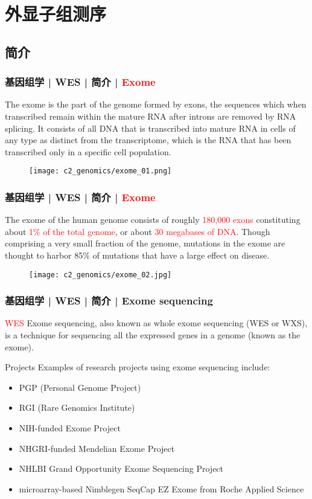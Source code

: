 \section{外显子组测序}
\subsection{简介}
\begin{frame}
  \frametitle{基因组学 | WES | 简介 | \textcolor{red}{Exome}}
  The exome is the part of the genome formed by exons, the sequences which when transcribed remain within the mature RNA after introns are removed by RNA splicing. It consists of all DNA that is transcribed into mature RNA in cells of any type as distinct from the transcriptome, which is the RNA that has been transcribed only in a specific cell population.
  \begin{figure}
    \centering
    \texttt{[image: c2\_genomics/exome\_01.png]}
  \end{figure}
\end{frame}

\begin{frame}
  \frametitle{基因组学 | WES | 简介 | \textcolor{red}{Exome}}
  The exome of the human genome consists of roughly \textcolor{red}{180,000 exons} constituting about \textcolor{red}{1\% of the total genome}, or about \textcolor{red}{30 megabases of DNA}. Though comprising a very small fraction of the genome, mutations in the exome are thought to harbor 85\% of mutations that have a large effect on disease.
  \begin{figure}
    \centering
    \texttt{[image: c2\_genomics/exome\_02.jpg]}
  \end{figure}
\end{frame}

\begin{frame}
  \frametitle{基因组学 | WES | 简介 | Exome sequencing}
  \begin{block}{\textcolor{red}{WES}}
  Exome sequencing, also known as whole exome sequencing (WES or WXS), is a technique for sequencing all the expressed genes in a genome (known as the exome).
  \end{block}
  \pause
  \begin{block}{Projects}
    Examples of research projects using exome sequencing include:
    \begin{itemize}
      \item PGP (Personal Genome Project)
      \item RGI (Rare Genomics Institute)
      \item NIH-funded Exome Project
      \item NHGRI-funded Mendelian Exome Project
      \item NHLBI Grand Opportunity Exome Sequencing Project
      \item microarray-based Nimblegen SeqCap EZ Exome from Roche Applied Science
    \end{itemize}
  \end{block}
\end{frame}

